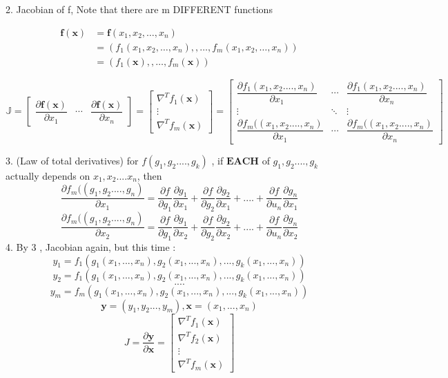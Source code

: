 \documentclass{article}
\begin{document}
2. Jacobian of f, Note that there are m DIFFERENT functions 

$$
\begin{aligned}
\mathbf{f}(\mathbf{x})&=\mathbf{f}(x_1,x_2,\dots,x_n)\\
&=(f_1(x_1,x_2,\dots,x_n),,\dots,f_m(x_1,x_2,\dots,x_n))\\
&=(f_1(\mathbf{x}),,\dots,f_m(\mathbf{x}))
\end{aligned}
$$

$$
\mathbb{J}=\left[\begin{array}{ccc}
\dfrac{\partial \mathbf{f}(\mathbf{x})}{\partial x_{1}} & \cdots & \dfrac{\partial \mathbf{f}(\mathbf{x})}{\partial x_{n}}
\end{array}\right]=\left[\begin{array}{c}
\nabla^{T} f_{1}(\mathbf{x}) \\
\vdots \\
\nabla^{T} f_{m}(\mathbf{x})
\end{array}\right]=\left[\begin{array}{ccc}
\dfrac{\partial f_{1}(x_1,x_2....,x_n)}{\partial x_{1}} & \cdots & \dfrac{\partial f_{1}(x_1,x_2....,x_n)}{\partial x_{n}} \\
\vdots & \ddots & \vdots \\
\dfrac{\partial f_{m}((x_1,x_2....,x_n)}{\partial x_{1}} & \cdots & \dfrac{\partial f_{m}((x_1,x_2....,x_n)}{\partial x_{n}}
\end{array}\right]
$$

3. (Law of total derivatives) for \( f(g_1,g_2...., g_k) \) , if  \(\mathbf{EACH}\) of \( g_1,g_2...., g_k \) actually depends on \(x_1,x_2....x_n\), then 
\[
	\dfrac{\partial f_{m}((g_1,g_2....,g_n)}{\partial x_1} = \dfrac{\partial f}{\partial g_1}
\dfrac{\partial g_1}{\partial x_1} + \dfrac{\partial f}{\partial g_2}
\dfrac{\partial g_2}{\partial x_1} + .... + \dfrac{\partial f}{\partial u_n}
\dfrac{\partial g_n}{\partial x_1}
\]
\[
	\dfrac{\partial f_{m}((g_1,g_2....,g_n)}{\partial x_2} = \dfrac{\partial f}{\partial g_1}
\dfrac{\partial g_1}{\partial x_2} + \dfrac{\partial f}{\partial g_2}
\dfrac{\partial g_2}{\partial x_2} + .... + \dfrac{\partial f}{\partial u_n}
\dfrac{\partial g_n}{\partial x_2}
\]
4. By 3 , Jacobian again, but this time : \newline 
\[y_1=f_1(g_1(x_1,...,x_n),g_2(x_1,...,x_n),...,g_k(x_1,...,x_n))\]
\[y_2=f_1(g_1(x_1,...,x_n),g_2(x_1,...,x_n),...,g_k(x_1,...,x_n))\]
\[....\]
\[y_m=f_m(g_1(x_1,...,x_n),g_2(x_1,...,x_n),...,g_k(x_1,...,x_n))\]
\[\mathbf{y} =(y_1,y_2...,y_m) ,  \mathbf{x} = (x_1,...,x_n) \]
\[J=\dfrac{\partial \mathbf{y}}{\partial \mathbf{x}} = \left[\begin{array}{c}
\nabla^{T} f_{1}(\mathbf{x}) \\
\nabla^{T} f_{2}(\mathbf{x}) \\
\vdots \\
\nabla^{T} f_{m}(\mathbf{x})
\end{array}\right]
\]
\end{document}
